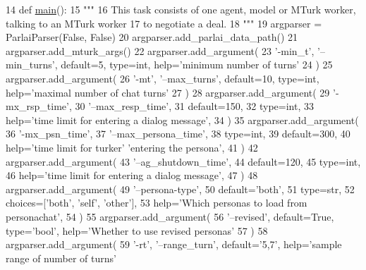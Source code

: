 \begin{DoxyCode}
14 \textcolor{keyword}{def }\hyperlink{namespaceprojects_1_1wizard__of__wikipedia_1_1mturk__evaluation__task_1_1run_ad3ab2c71f8083c3112815c0b363d316b}{main}():
15     \textcolor{stringliteral}{"""}
16 \textcolor{stringliteral}{    This task consists of one agent, model or MTurk worker, talking to an MTurk worker}
17 \textcolor{stringliteral}{    to negotiate a deal.}
18 \textcolor{stringliteral}{    """}
19     argparser = ParlaiParser(\textcolor{keyword}{False}, \textcolor{keyword}{False})
20     argparser.add\_parlai\_data\_path()
21     argparser.add\_mturk\_args()
22     argparser.add\_argument(
23         \textcolor{stringliteral}{'-min\_t'}, \textcolor{stringliteral}{'--min\_turns'}, default=5, type=int, help=\textcolor{stringliteral}{'minimum number of turns'}
24     )
25     argparser.add\_argument(
26         \textcolor{stringliteral}{'-mt'}, \textcolor{stringliteral}{'--max\_turns'}, default=10, type=int, help=\textcolor{stringliteral}{'maximal number of chat turns'}
27     )
28     argparser.add\_argument(
29         \textcolor{stringliteral}{'-mx\_rsp\_time'},
30         \textcolor{stringliteral}{'--max\_resp\_time'},
31         default=150,
32         type=int,
33         help=\textcolor{stringliteral}{'time limit for entering a dialog message'},
34     )
35     argparser.add\_argument(
36         \textcolor{stringliteral}{'-mx\_psn\_time'},
37         \textcolor{stringliteral}{'--max\_persona\_time'},
38         type=int,
39         default=300,
40         help=\textcolor{stringliteral}{'time limit for turker'} \textcolor{stringliteral}{'entering the persona'},
41     )
42     argparser.add\_argument(
43         \textcolor{stringliteral}{'--ag\_shutdown\_time'},
44         default=120,
45         type=int,
46         help=\textcolor{stringliteral}{'time limit for entering a dialog message'},
47     )
48     argparser.add\_argument(
49         \textcolor{stringliteral}{'--persona-type'},
50         default=\textcolor{stringliteral}{'both'},
51         type=str,
52         choices=[\textcolor{stringliteral}{'both'}, \textcolor{stringliteral}{'self'}, \textcolor{stringliteral}{'other'}],
53         help=\textcolor{stringliteral}{'Which personas to load from personachat'},
54     )
55     argparser.add\_argument(
56         \textcolor{stringliteral}{'--revised'}, default=\textcolor{keyword}{True}, type=\textcolor{stringliteral}{'bool'}, help=\textcolor{stringliteral}{'Whether to use revised personas'}
57     )
58     argparser.add\_argument(
59         \textcolor{stringliteral}{'-rt'}, \textcolor{stringliteral}{'--range\_turn'}, default=\textcolor{stringliteral}{'5,7'}, help=\textcolor{stringliteral}{'sample range of number of turns'}

\end{DoxyCode}
